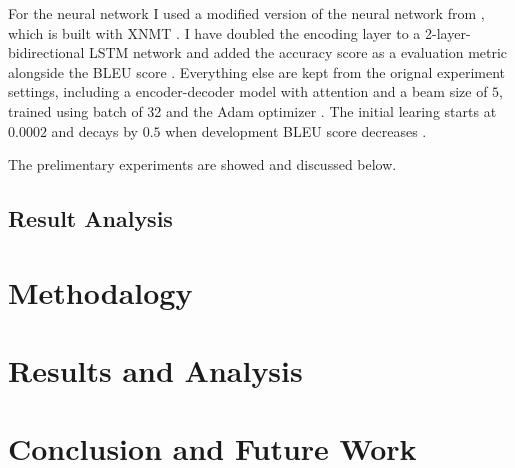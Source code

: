 \documentclass[thesis,fonts=libertine]{cluu}
\begin{document}
For the neural network I used a modified version of the neural network from \cite{Qi:2018aa}, which is built with XNMT \cite{Neubig:2018aa}. I have doubled the encoding layer to a 2-layer-bidirectional LSTM network and added the accuracy score as a evaluation metric alongside the BLEU score \parencite{papineni-etal-2002-bleu}. Everything else are kept from the orignal experiment settings, including a encoder-decoder model with attention \parencite{Bahdanau:2014aa} and a beam size of $5$, trained using batch of 32 and the Adam optimizer \parencite{Kingma:2014aa}. The initial learing starts at $0.0002$ and decays by $0.5$ when development BLEU score decreases \parencite{Denkowski:2017aa}.

The prelimentary experiments are showed and discussed below.

\section{Result Analysis}

\chapter{Methodalogy}
\label{chap:method}

\chapter{Results and Analysis}
\label{chap:results}

\chapter{Conclusion and Future Work}
\label{chap:analysis}

\printbibliography
\end{document}
